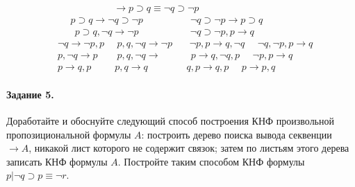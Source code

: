 \documentclass[a4paper,12pt]{article}
\begin{document}
\begin{Solution}
\[
	\begin{split}
		& ~~~~~~~~~~~~~~~~~~~~~~~~~~\rightarrow p \supset q \equiv \neg q \supset \neg p \\
		& ~~~~~~ p \supset q \rightarrow \neg q \supset \neg p ~~~~~~~~~~~~~~~~~~~~~~ \neg q \supset \neg p \rightarrow p \supset q \\
		& ~~~~~~~~ p \supset q, \neg q \rightarrow \neg p ~~~~~~~~~~~~~~~~~~~~~~~~ \neg q \supset \neg p, p \rightarrow q \\
		& \neg q \rightarrow \neg p, p ~~~~~~ p, q, \neg q \rightarrow \neg p ~~~~~~~~ \neg p, p \rightarrow q, \neg q ~~~~~~ \neg q, \neg p, p \rightarrow q \\
		& p,\neg q \rightarrow p ~~~~~~~~~ p,q,\neg q \rightarrow ~~~~~~~~~~~~~~ p \rightarrow q,\neg q, p ~~~~~~ \neg p, p \rightarrow q \\
		& p \rightarrow q,p ~~~~~~~~~~~ p,q \rightarrow q ~~~~~~~~~~~~~~~~~~ q,p \rightarrow q,p ~~~~~~ p \rightarrow p,q
	\end{split}
\]
\end{Solution}

\paragraph{Задание 5.} Доработайте и обоснуйте следующий способ построения КНФ произвольной пропозициональной формулы $A$: построить дерево поиска вывода секвенции $\rightarrow A$, никакой лист которого не содержит связок; затем по листьям этого дерева записать КНФ формулы $A$. Постройте таким способом КНФ формулы $p | \neg q \supset p \equiv \neg r$.
\end{document}
